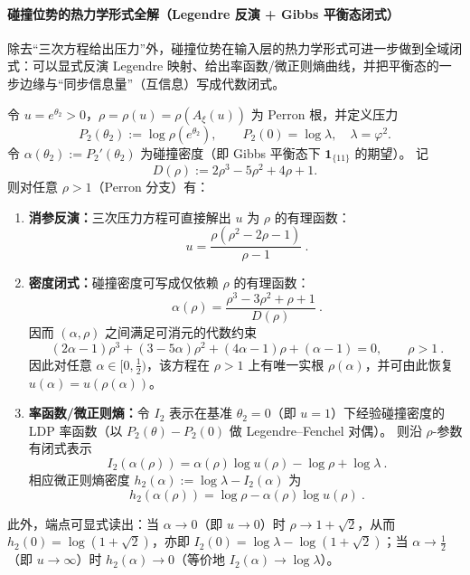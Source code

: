  \paragraph{碰撞位势的热力学形式全解（Legendre 反演 + Gibbs 平衡态闭式）}
除去“三次方程给出压力”外，碰撞位势在输入层的热力学形式可进一步做到全域闭式：可以显式反演 Legendre 映射、给出率函数/微正则熵曲线，并把平衡态的一步边缘与“同步信息量”（互信息）写成代数闭式。

\begin{proposition}\label{prop:collision-legendre-explicit-inversion}
令 \(u=e^{\theta_2}>0\)，\(\rho=\rho(u)=\rho(A_\xi(u))\) 为 Perron 根，并定义压力
\[
P_2(\theta_2):=\log\rho(e^{\theta_2}),\qquad P_2(0)=\log\lambda,\quad \lambda=\varphi^2.
\]
令 \(\alpha(\theta_2):=P_2'(\theta_2)\) 为碰撞密度（即 Gibbs 平衡态下 \(\mathbf{1}_{\{11\}}\) 的期望）。
记
\[
D(\rho):=2\rho^3-5\rho^2+4\rho+1.
\]
则对任意 \(\rho>1\)（Perron 分支）有：
\begin{enumerate}
  \item \textbf{消参反演：}三次压力方程可直接解出 \(u\) 为 \(\rho\) 的有理函数：
  \[
  \boxed{\ u=\frac{\rho(\rho^2-2\rho-1)}{\rho-1}\ }.
  \]
  \item \textbf{密度闭式：}碰撞密度可写成仅依赖 \(\rho\) 的有理函数：
  \[
  \boxed{\ \alpha(\rho)=\frac{\rho^3-3\rho^2+\rho+1}{D(\rho)}\ }.
  \]
  因而 \((\alpha,\rho)\) 之间满足可消元的代数约束
  \[
  \boxed{\ (2\alpha-1)\rho^3+(3-5\alpha)\rho^2+(4\alpha-1)\rho+(\alpha-1)=0,\qquad \rho>1\ }.
  \]
  因此对任意 \(\alpha\in[0,\tfrac12)\)，该方程在 \(\rho>1\) 上有唯一实根 \(\rho(\alpha)\)，并可由此恢复 \(u(\alpha)=u(\rho(\alpha))\)。
  \item \textbf{率函数/微正则熵：}令 \(I_2\) 表示在基准 \(\theta_2=0\)（即 \(u=1\)）下经验碰撞密度的 LDP 率函数（以 \(P_2(\theta)-P_2(0)\) 做 Legendre--Fenchel 对偶）。
  则沿 \(\rho\)-参数有闭式表示
  \[
  \boxed{\ I_2(\alpha(\rho))=\alpha(\rho)\log u(\rho)-\log\rho+\log\lambda\ }.
  \]
  相应微正则熵密度 \(h_2(\alpha):=\log\lambda-I_2(\alpha)\) 为
  \[
  \boxed{\ h_2(\alpha(\rho))=\log\rho-\alpha(\rho)\log u(\rho)\ }.
  \]
\end{enumerate}
此外，端点可显式读出：当 \(\alpha\to 0\)（即 \(u\to 0\)）时 \(\rho\to 1+\sqrt2\)，从而 \(h_2(0)=\log(1+\sqrt2)\)，亦即 \(I_2(0)=\log\lambda-\log(1+\sqrt2)\)；当 \(\alpha\to \tfrac12\)（即 \(u\to\infty\)）时 \(h_2(\alpha)\to 0\)（等价地 \(I_2(\alpha)\to\log\lambda\)）。
\end{proposition}

